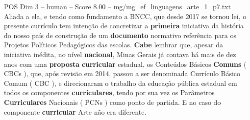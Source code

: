 \begin{textsample}{POS Dim 3 – human – Score 8.00 – mg/mg\_ef\_linguagens\_arte\_1\_p7.txt}  \label{ex:f3_pos_002}
Aliada a ela, e tendo como fundamento a BNCC, que desde 2017 se tornou lei, o presente currículo tem intenção de concretizar a \textbf{primeira} iniciativa da história do nosso país de construção de um \textbf{documento} normativo referência para os Projetos Políticos Pedagógicos das escolas. \textbf{Cabe} lembrar que, apesar da iniciativa inédita, no nível \textbf{nacional}, Minas Gerais já contava há mais de dez anos com uma \textbf{proposta} \textbf{curricular} estadual, os Conteúdos Básicos \textbf{Comuns} ( CBCs ), que, após revisão em 2014, passou a ser denominada Currículo Básico Comum ( CBC ), e direcionaram o trabalho da educação pública estadual em todos os componentes \textbf{curriculares}, tendo por sua vez os Parâmetros \textbf{Curriculares} Nacionais ( PCNs ) como ponto de partida.
E no caso do componente \textbf{curricular} Arte não era diferente.

\end{textsample}
